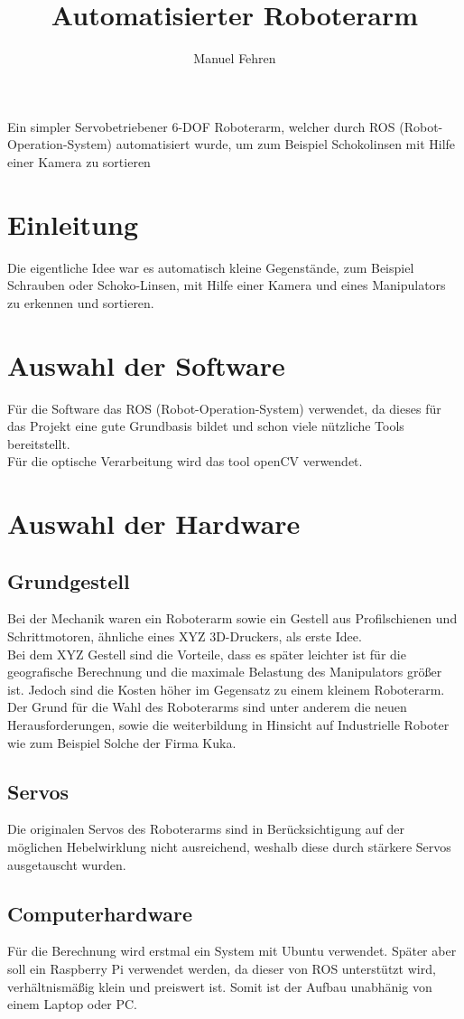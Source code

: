 \documentclass[12pt,a4paper]{article}
\author{Manuel Fehren}
\title{Automatisierter Roboterarm}
\begin{document}
\maketitle
\begin{center}
Ein simpler Servobetriebener 6-DOF Roboterarm, welcher durch ROS (Robot-Operation-System) automatisiert wurde, um zum Beispiel Schokolinsen mit Hilfe einer Kamera zu sortieren
\end{center}
\thispagestyle{empty}
\newpage
\tableofcontents
\thispagestyle{empty}
\newpage
\setcounter{page}{1}
\section{Einleitung}
Die eigentliche Idee war es automatisch kleine Gegenstände, zum Beispiel Schrauben oder Schoko-Linsen, mit Hilfe einer Kamera und eines Manipulators zu erkennen und sortieren.
\section{Auswahl der Software}
Für die Software das ROS (Robot-Operation-System) verwendet, da dieses für das Projekt eine gute Grundbasis bildet und schon viele nützliche Tools bereitstellt.\\
Für die optische Verarbeitung wird das tool openCV verwendet.
\section{Auswahl der Hardware}
\subsection{Grundgestell}
Bei der Mechanik waren ein Roboterarm sowie ein Gestell aus Profilschienen und Schrittmotoren, ähnliche eines XYZ 3D-Druckers, als erste Idee.\\
Bei dem XYZ Gestell sind die Vorteile, dass es später leichter ist für die geografische Berechnung und die maximale Belastung des Manipulators größer ist. Jedoch sind die Kosten höher im Gegensatz zu einem kleinem Roboterarm.\\
Der Grund für die Wahl des Roboterarms sind unter anderem die neuen Herausforderungen, sowie die weiterbildung in Hinsicht auf Industrielle Roboter wie zum Beispiel Solche der Firma Kuka.
\subsection{Servos}
Die originalen Servos des Roboterarms sind in Berücksichtigung auf der möglichen Hebelwirklung nicht ausreichend, weshalb diese durch stärkere Servos ausgetauscht wurden.
\subsection{Computerhardware}
Für die Berechnung wird erstmal ein System mit Ubuntu verwendet. Später aber soll ein Raspberry Pi verwendet werden, da dieser von ROS unterstützt wird, verhältnismäßig klein und preiswert ist. Somit ist der Aufbau unabhänig von einem Laptop oder PC.
\end{document}
